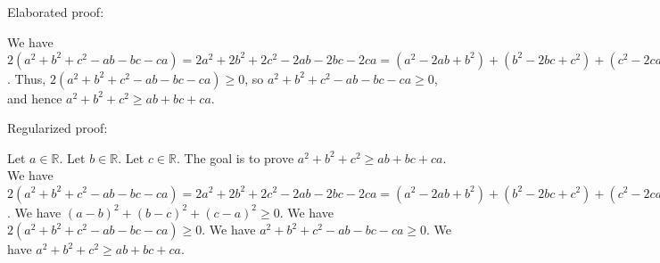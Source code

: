 \documentclass{article}
\begin{document}
Elaborated proof:
\begin{tcolorbox}[colback=green!10, width=\linewidth]
We have $2(a^2 + b^2 + c^2 - ab - bc - ca) = 2a^2 + 2b^2 + 2c^2 - 2ab - 2bc - 2ca = (a^2 - 2ab + b^2) + (b^2 - 2bc + c^2) + (c^2 - 2ca + a^2) = (a-b)^2 + (b-c)^2 + (c-a)^2 \ge 0$. Thus, $2(a^2 + b^2 + c^2 - ab - bc - ca) \ge 0$, so $a^2 + b^2 + c^2 - ab - bc - ca \ge 0$, and hence $a^2 + b^2 + c^2 \geq ab + bc + ca$.
\end{tcolorbox}

Regularized proof:
\begin{tcolorbox}[colback=red!10, width=\linewidth]
Let $a\in\mathbb{R}$.
Let $b\in\mathbb{R}$.
Let $c\in\mathbb{R}$.
The goal is to prove $a^2 + b^2 + c^2 \geq ab + bc + ca$.
We have $2(a^2 + b^2 + c^2 - ab - bc - ca) = 2a^2 + 2b^2 + 2c^2 - 2ab - 2bc - 2ca = (a^2 - 2ab + b^2) + (b^2 - 2bc + c^2) + (c^2 - 2ca + a^2) = {(a-b)}^2 + {(b-c)}^2 + {(c-a)}^2$.
We have ${(a-b)}^2 + {(b-c)}^2 + {(c-a)}^2 \ge 0$.
We have $2(a^2 + b^2 + c^2 - ab - bc - ca) \ge 0$.
We have $a^2 + b^2 + c^2 - ab - bc - ca \ge 0$.
We have $a^2 + b^2 + c^2 \geq ab + bc + ca$.
\end{tcolorbox}
\end{document}
